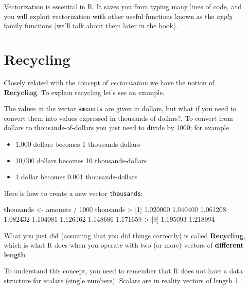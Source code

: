 \documentclass[
]{book}
\newenvironment{Shaded}{\begin{snugshade}}{\end{snugshade}}
\newcommand{\DecValTok}[1]{\textcolor[rgb]{0.00,0.00,0.81}{#1}}
\newcommand{\FloatTok}[1]{\textcolor[rgb]{0.00,0.00,0.81}{#1}}
\newcommand{\NormalTok}[1]{#1}
\newcommand{\OtherTok}[1]{\textcolor[rgb]{0.56,0.35,0.01}{#1}}
\newcommand{\SpecialCharTok}[1]{\textcolor[rgb]{0.00,0.00,0.00}{#1}}
\providecommand{\tightlist}{%
  \setlength{\itemsep}{0pt}\setlength{\parskip}{0pt}}
\begin{document}
Vectorization is essential in R. It saves you from typing many lines of code,
and you will exploit vectorization with other useful functions known as the
\emph{apply} family functions (we'll talk about them later in the book).

\hypertarget{recycling}{%
\section{Recycling}\label{recycling}}

Closely related with the concept of \emph{vectorization} we have the notion of
\textbf{Recycling}. To explain recycling let's see an example.

The values in the vector \texttt{amounts} are given in dollars, but what if you need
to convert them into values expressed in thousands of dollars?. To convert
from dollars to thousands-of-dollars you just need to divide by 1000; for
example

\begin{itemize}
\tightlist
\item
  1,000 dollars becomes 1 thousands-dollars
\item
  10,000 dollars becomes 10 thousands-dollars
\item
  1 dollar becomes 0.001 thousands-dollars
\end{itemize}

Here is how to create a new vector \texttt{thousands}:

\begin{Shaded}
\begin{Highlighting}[]
\NormalTok{thousands }\OtherTok{\textless{}{-}}\NormalTok{ amounts }\SpecialCharTok{/} \DecValTok{1000}
\NormalTok{thousands}
\SpecialCharTok{\textgreater{}}\NormalTok{  [}\DecValTok{1}\NormalTok{] }\FloatTok{1.020000} \FloatTok{1.040400} \FloatTok{1.061208} \FloatTok{1.082432} \FloatTok{1.104081} \FloatTok{1.126162} \FloatTok{1.148686} \FloatTok{1.171659}
\SpecialCharTok{\textgreater{}}\NormalTok{  [}\DecValTok{9}\NormalTok{] }\FloatTok{1.195093} \FloatTok{1.218994}
\end{Highlighting}
\end{Shaded}

What you just did (assuming that you did things correctly) is called
\textbf{Recycling}, which is what R does when you operate with two (or more) vectors
of \textbf{different length}.

To understand this concept, you need to remember that R does not have a data
structure for scalars (single numbers). Scalars are in reality vectors of
length 1.
\end{document}
